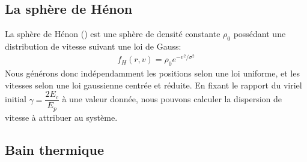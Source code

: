 



		\subsection{La sphère de Hénon}

			La sphère de Hénon (\cite{1964AnAp...27...83H}) est une sphère de densité
			constante $\rho_0$ possédant une distribution de vitesse suivant
			une loi de Gauss:
			\begin{align}
				f_H(r, v) = \rho_0 e^{-v^2/\sigma^2}
			\end{align}
			Nous générons donc indépendamment les positions selon une loi uniforme, et les vitesses selon
			une loi gaussienne centrée et réduite. En fixant le rapport du viriel initial $\gamma = \dfrac{2E_c}{E_p}$ à une valeur
			donnée, nous pouvons calculer la dispersion de vitesse à attribuer au système.


		\subsection{Bain thermique}

